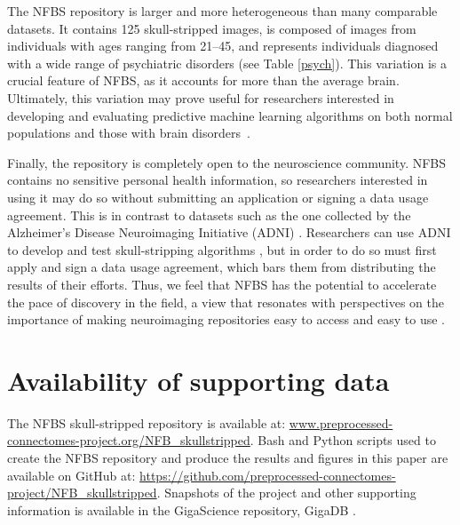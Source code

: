 The NFBS repository is larger and more heterogeneous than many comparable datasets. It contains 125 skull-stripped images, is composed of images from individuals with ages ranging from 21--45, and represents individuals diagnosed with a wide range of psychiatric disorders (see Table \ref{psych}). This variation is a crucial feature of NFBS, as it accounts for more than the average brain. Ultimately, this variation may prove useful for researchers interested in developing and evaluating predictive machine learning algorithms on both normal populations and those with brain disorders~\cite{gabrieli2015prediction}.

Finally, the repository is completely open to the neuroscience community. NFBS contains no sensitive personal health information, so researchers interested in using it may do so without submitting an application or signing a data usage agreement. This is in contrast to datasets such as the one collected by the Alzheimer's Disease Neuroimaging Initiative (ADNI) \cite{pmid17476317}. Researchers can use ADNI to develop and test skull-stripping algorithms \cite{pmid21195780}, but in order to do so must first apply and sign a data usage agreement, which bars them from distributing the results of their efforts. Thus, we feel that NFBS has the potential to accelerate the pace of discovery in the field, a view that resonates with perspectives on the importance of making neuroimaging repositories easy to access and easy to use \cite{Nichols054262}.

\section*{Availability of supporting data}
The NFBS skull-stripped repository is available at: \url{www.preprocessed-connectomes-project.org/NFB\_skullstripped}. Bash and Python scripts used to create the NFBS repository and produce the results and figures in this paper are available on GitHub at: \url{https://github.com/preprocessed-connectomes-project/NFB\_skullstripped}. Snapshots of the project and other supporting information is available in the GigaScience repository, GigaDB \cite{puccio2016}.
